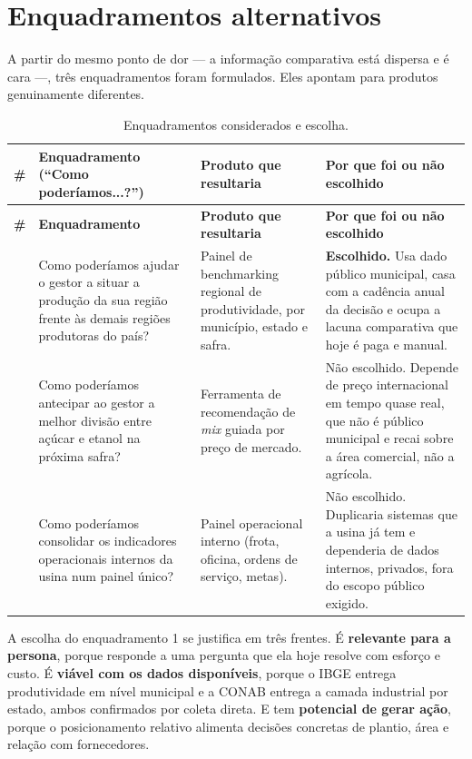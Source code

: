 \documentclass[11pt,a4paper]{article}
\begin{document}
\section{Enquadramentos alternativos}

A partir do mesmo ponto de dor — a informação comparativa está dispersa e é cara —, três
enquadramentos foram formulados. Eles apontam para produtos genuinamente diferentes.

\begin{longtable}{c L{5.0cm} L{4.4cm} L{4.4cm}}
\caption{Enquadramentos considerados e escolha.}\label{tab:enquadramentos}\\
\toprule
\textbf{\#} & \textbf{Enquadramento (``Como poderíamos...?'')} & \textbf{Produto que resultaria} & \textbf{Por que foi ou não escolhido}\\
\midrule
\endfirsthead
\toprule
\textbf{\#} & \textbf{Enquadramento} & \textbf{Produto que resultaria} & \textbf{Por que foi ou não escolhido}\\
\midrule
\endhead
\bottomrule
{} &
Como poderíamos ajudar o gestor a situar a produção da sua região frente às demais regiões
produtoras do país? &
Painel de benchmarking regional de produtividade, por município, estado e safra. &
\textbf{Escolhido.} Usa dado público municipal, casa com a cadência anual da decisão e ocupa
a lacuna comparativa que hoje é paga e manual.\\
 &
Como poderíamos antecipar ao gestor a melhor divisão entre açúcar e etanol na próxima safra? &
Ferramenta de recomendação de \textit{mix} guiada por preço de mercado. &
Não escolhido. Depende de preço internacional em tempo quase real, que não é público
municipal e recai sobre a área comercial, não a agrícola.\\
 &
Como poderíamos consolidar os indicadores operacionais internos da usina num painel único? &
Painel operacional interno (frota, oficina, ordens de serviço, metas). &
Não escolhido. Duplicaria sistemas que a usina já tem e dependeria de dados internos,
privados, fora do escopo público exigido.\\
\end{longtable}

A escolha do enquadramento 1 se justifica em três frentes. É \textbf{relevante para a
persona}, porque responde a uma pergunta que ela hoje resolve com esforço e custo. É
\textbf{viável com os dados disponíveis}, porque o IBGE entrega produtividade em nível
municipal e a CONAB entrega a camada industrial por estado, ambos confirmados por coleta
direta. E tem \textbf{potencial de gerar ação}, porque o posicionamento relativo alimenta
decisões concretas de plantio, área e relação com fornecedores.
\end{document}
